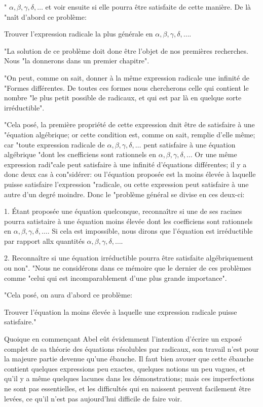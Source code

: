 \documentclass{article}
\begin{document}
" \(\alpha, \beta, \gamma, \delta, \ldots\) et voir ensuite si elle pourra être satisfaite de cette manière. De là "naît d'abord ce problème:

Trouver l'expression radicale la plus générale en \(\alpha, \beta, \gamma, \delta, \ldots\).

"La solution de ce problème doit done être l'objet de nos premières recherches. Nous "la donnerons dans un premier chapitre".

"On peut, comme on sait, donner à la même expression radicale une infinité de "Formes différentes. De toutes ces formes nous chercherons celle qui contient le nombre "le plus petit possible de radicaux, et qui est par là en quelque sorte irréductible".

"Cela posé, la première propriété de cette expression dnit être de satisfaire à une "équation algébrique; or cette condition est, comme on sait, remplie d'elle même; car "toute expression radicale de \(\alpha, \beta, \gamma, \delta, \ldots\) pent satisfaire à une équation algébrique "dont les cnefficiens sont rationnels en \(\alpha, \beta, \gamma, \delta, \ldots\) Or une même expression radi"cale peut satisfaire à une infinité d'équations différentes; il y a donc deux cas à con"sidérer: ou l'équation proposée est la moins élevée à laquelle puisse satisfaire l'expression "radicale, ou cette expression peut satisfaire à une autre d'un degré moindre. Donc le "problème général se divise en ces deux-ci:

1. Étant proposée une équation quelconque, reconnaître si une de ses racines pourra satistaire à une équation moins élevée dont les coefficiens sont rationnels en \(\alpha, \beta, \gamma, \delta, \ldots\). Si cela est impossible, nous dirons que l'équation est irréductible par rapport allx quantités \(\alpha, \beta, \gamma, \delta, \ldots\).

2. Reconnaître si une équation irréductible pourra être satisfaite algébriquement ou non". "Nous ne considérons dans ce mémoire que le dernier de ces problèmes comme "celui qui est incomparablement d'une plus grande importance".

"Cela posé, on aura d'abord ce problème:

Trouver l'équation la moins élevée à laquelle une expression radicale puisse satisfaire."

Quoique en commençant Abel eût évidemment l'intention d'écrire un exposé complet de sa théorie des équations résolubles par radicaux, son travail n'est pour la majeure partie devenue qu'une ébauche. Il faut bien avouer que cette ébauche contient quelques expressions peu exactes, quelques notions un peu vagues, et qu'il y a même quelques lacunes dans les démonstrations; mais ces imperfections ne sont pas essentielles, et les difficultés qui en naissent peuvent facilement être levées, ce qu'il n'est pas aujourd'hui difficile de faire voir.
\end{document}
